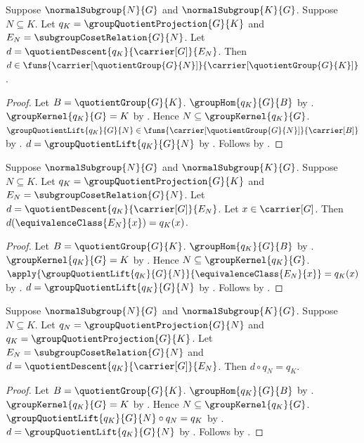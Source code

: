 \begin{proposition}\label{group_quotient_comparison_type}
    Suppose $\normalSubgroup{N}{G}$ and $\normalSubgroup{K}{G}$.
    Suppose $N\subseteq K$.
    Let $q_K=\groupQuotientProjection{G}{K}$ and
        $E_N=\subgroupCosetRelation{G}{N}$.
    Let $d=\quotientDescent{q_K}{\carrier[G]}{E_N}$.
    Then $d\in\funs{\carrier[\quotientGroup{G}{N}]}{
        \carrier[\quotientGroup{G}{K}]}$.
\end{proposition}
\begin{proof}
    Let $B=\quotientGroup{G}{K}$.
    $\groupHom{q_K}{G}{B}$ by
        .
    $\groupKernel{q_K}{G}=K$ by
        .
    Hence $N\subseteq\groupKernel{q_K}{G}$.
    $\groupQuotientLift{q_K}{G}{N}\in
        \funs{\carrier[\quotientGroup{G}{N}]}{\carrier[B]}$ by
        .
    $d=\groupQuotientLift{q_K}{G}{N}$ by
        .
    Follows by \auto.
\end{proof}

\begin{proposition}\label{group_quotient_comparison_apply}
    Suppose $\normalSubgroup{N}{G}$ and $\normalSubgroup{K}{G}$.
    Suppose $N\subseteq K$.
    Let $q_K=\groupQuotientProjection{G}{K}$ and
        $E_N=\subgroupCosetRelation{G}{N}$.
    Let $d=\quotientDescent{q_K}{\carrier[G]}{E_N}$.
    Let $x\in\carrier[G]$.
    Then $d(\equivalenceClass{E_N}{x})=q_K(x)$.
\end{proposition}
\begin{proof}
    Let $B=\quotientGroup{G}{K}$.
    $\groupHom{q_K}{G}{B}$ by
        .
    $\groupKernel{q_K}{G}=K$ by
        .
    Hence $N\subseteq\groupKernel{q_K}{G}$.
    $\apply{\groupQuotientLift{q_K}{G}{N}}
        {\equivalenceClass{E_N}{x}}=q_K(x)$ by
        .
    $d=\groupQuotientLift{q_K}{G}{N}$ by
        .
    Follows by \auto.
\end{proof}

\begin{theorem}\label{group_quotient_comparison_factorization}
    Suppose $\normalSubgroup{N}{G}$ and $\normalSubgroup{K}{G}$.
    Suppose $N\subseteq K$.
    Let $q_N=\groupQuotientProjection{G}{N}$ and
        $q_K=\groupQuotientProjection{G}{K}$.
    Let $E_N=\subgroupCosetRelation{G}{N}$ and
        $d=\quotientDescent{q_K}{\carrier[G]}{E_N}$.
    Then $d\circ q_N=q_K$.
\end{theorem}
\begin{proof}
    Let $B=\quotientGroup{G}{K}$.
    $\groupHom{q_K}{G}{B}$ by
        .
    $\groupKernel{q_K}{G}=K$ by
        .
    Hence $N\subseteq\groupKernel{q_K}{G}$.
    $\groupQuotientLift{q_K}{G}{N}\circ q_N=q_K$ by
        .
    $d=\groupQuotientLift{q_K}{G}{N}$ by
        .
    Follows by \auto.
\end{proof}

